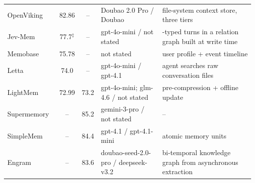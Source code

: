 \begin{gentable}[!htb]
\begin{tabularx}{\linewidth}{@{}l S[table-format=2.2] S[table-format=2.1] >{\raggedright\arraybackslash}p{4.7cm}>{\raggedright\arraybackslash}X@{}}
OpenViking~\citep{openviking2026} & 82.86 & {--} & Doubao 2.0 Pro / Doubao & file-system context store, three tiers \\
Jev-Mem~\citep{jiang2026jevmem} & 77.7{$^\ddagger$} & {--} & gpt-4o-mini / not stated & \jev{}-typed turns in a relation graph built at write time \\
Memobase~\citep{memobase2025} & 75.78 & {--} & not stated & user profile + event timeline \\
Letta~\citep{letta2024} & 74.0 & {--} & gpt-4o-mini / gpt-4.1 & agent searches raw conversation files \\
LightMem~\citep{fang2025lightmem} & 72.99 & 73.2 & gpt-4o-mini; \lme{} glm-4.6 / not stated & pre-compression + offline update \\
Supermemory~\citep{supermemory2026} & {--} & 85.2 & gemini-3-pro / not stated & -- \\
SimpleMem~\citep{simplemem2026} & {--} & 84.4 & gpt-4.1 / gpt-4.1-mini & atomic memory units \\
Engram~\citep{wang2026engram} & {--} & 83.6 & doubao-seed-2.0-pro / deepseek-v3.2 & bi-temporal knowledge graph from asynchronous extraction \\
\bottomrule
\end{tabularx}
\end{gentable}
